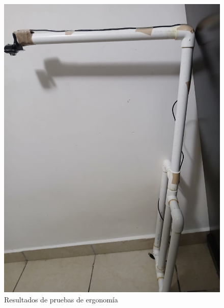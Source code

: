 \begin{figure}
    \centering
    \includegraphics[width=1\textwidth, height=.9\textheight]{img/PruebaErgonomica6.png}
    \caption{Resultados de pruebas de ergonomía}
    \label{fig:ergo-test}
\end{figure}


